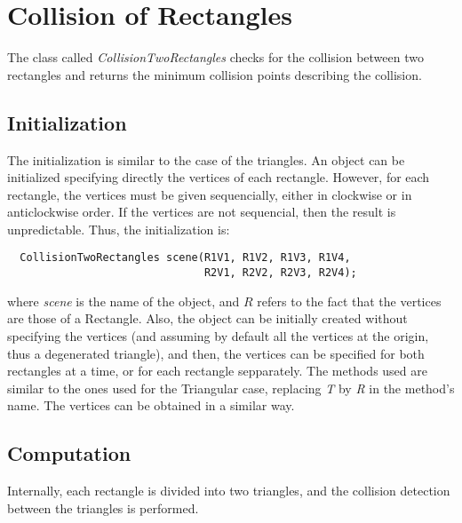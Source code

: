 \documentclass[11pt,a4paper]{article}
\begin{document}
\section{Collision of Rectangles}

The class called \textit{CollisionTwoRectangles} checks for the collision between two rectangles and returns the minimum collision points describing the collision.

\subsection*{Initialization}
 The initialization is similar to the case of the triangles. An object can be initialized specifying directly the vertices of each rectangle. However, for each rectangle, the vertices must be given sequencially, either in clockwise or in anticlockwise order. If the vertices are not sequencial, then the result is unpredictable. Thus, the initialization is:
  \begin{lstlisting}
  CollisionTwoRectangles scene(R1V1, R1V2, R1V3, R1V4,
                               R2V1, R2V2, R2V3, R2V4);
  \end{lstlisting}
where \textit{scene} is the name of the object, and $R$ refers to the fact that the vertices are those of a Rectangle. Also, the object can be initially created without specifying the vertices (and assuming by default all the vertices at the origin, thus a degenerated triangle), and then, the vertices can be specified for both rectangles at a time, or for each rectangle sepparately. The methods used are similar to the ones used for the Triangular case, replacing \textit{T} by \textit{R} in the method's name. The vertices can be obtained in a similar way. 

\subsection*{Computation}

Internally, each rectangle is divided into two triangles, and the collision detection between the triangles is performed. 

\end{document}
